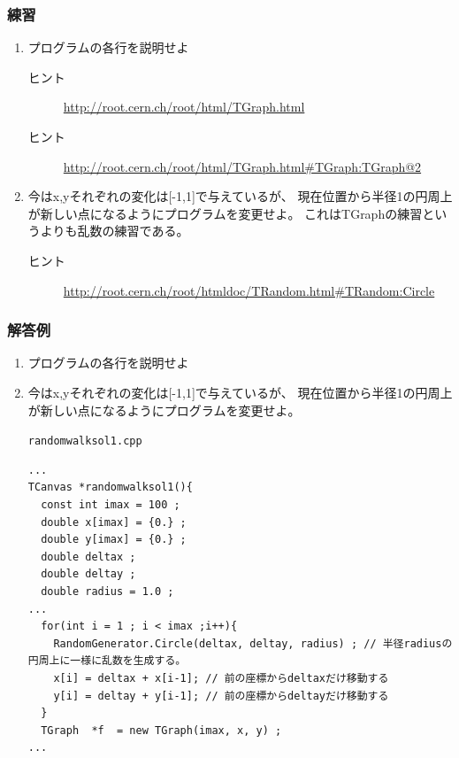 \subsubsection{練習}
\begin{enumerate}
 \item プログラムの各行を説明せよ
   \begin{description}
    \item[ヒント] \url{http://root.cern.ch/root/html/TGraph.html}
    \item[ヒント] \url{http://root.cern.ch/root/html/TGraph.html#TGraph:TGraph@2}
   \end{description}
 \item 今はx,yそれぞれの変化は[-1,1]で与えているが、
       現在位置から半径1の円周上が新しい点になるようにプログラムを変更せよ。
       これはTGraphの練習というよりも乱数の練習である。
   \begin{description}
    \item[ヒント] \url{http://root.cern.ch/root/htmldoc/TRandom.html#TRandom:Circle}
   \end{description}
       
\end{enumerate}

\subsubsection{解答例}

\begin{enumerate}
 \item プログラムの各行を説明せよ
 \item 今はx,yそれぞれの変化は[-1,1]で与えているが、
       現在位置から半径1の円周上が新しい点になるようにプログラムを変更せよ。
       \begin{itembox}{\texttt{randomwalksol1.cpp}}
\begin{verbatim}
...
TCanvas *randomwalksol1(){
  const int imax = 100 ;
  double x[imax] = {0.} ;
  double y[imax] = {0.} ;
  double deltax ;
  double deltay ;
  double radius = 1.0 ;
...
  for(int i = 1 ; i < imax ;i++){
    RandomGenerator.Circle(deltax, deltay, radius) ; // 半径radiusの円周上に一様に乱数を生成する。
    x[i] = deltax + x[i-1]; // 前の座標からdeltaxだけ移動する
    y[i] = deltay + y[i-1]; // 前の座標からdeltayだけ移動する
  }
  TGraph  *f  = new TGraph(imax, x, y) ;
...
\end{verbatim}
       \end{itembox}

\end{enumerate}
